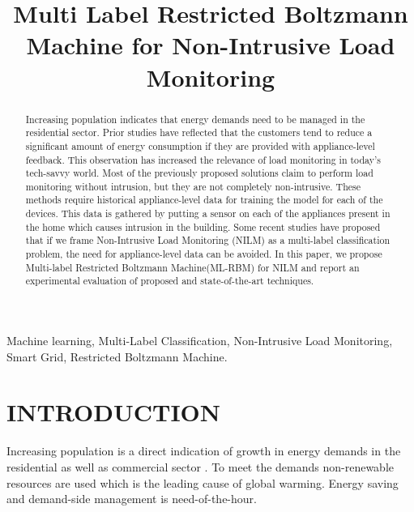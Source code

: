\documentclass{article}
\title{Multi Label Restricted Boltzmann Machine  for Non-Intrusive Load Monitoring}
\begin{document}
%
\maketitle
%

\maketitle
\thispagestyle{empty}
\pagestyle{empty}


\begin{abstract}
Increasing population indicates that energy demands need to be managed in the residential sector. Prior studies have reflected that the customers tend to reduce a significant amount of energy consumption if they are provided with appliance-level feedback. This observation has increased the relevance of load monitoring in today's tech-savvy world.  Most of the previously proposed solutions claim to perform load monitoring without intrusion, but they are not completely non-intrusive. These methods require historical appliance-level data for training the model for each of the devices. This data is gathered by putting a sensor on each of the appliances present in the home which causes intrusion in the building. Some recent studies have proposed that if we frame Non-Intrusive Load Monitoring (NILM) as a multi-label classification problem, the need for appliance-level data can be avoided. In this paper, we propose Multi-label Restricted Boltzmann Machine(ML-RBM) for NILM and report an experimental evaluation of proposed and state-of-the-art techniques.


\end{abstract}

\begin{keywords}
Machine learning, Multi-Label Classification, Non-Intrusive Load Monitoring, Smart Grid, Restricted Boltzmann Machine.
\end{keywords}


\section{INTRODUCTION}
Increasing population is a direct indication of growth in energy demands in the residential as well as commercial sector \cite{energy_use}.  To meet the demands non-renewable resources are used which is the leading cause of global warming\cite{archer2012global}. Energy saving and demand-side management is need-of-the-hour.
\end{document}
